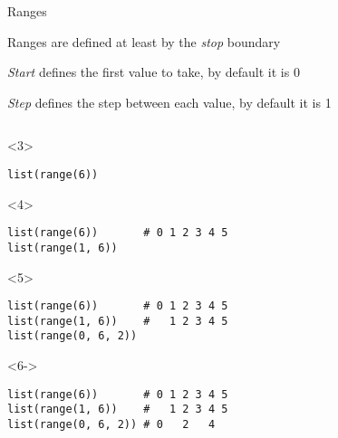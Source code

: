 \begin{frame}[fragile]{Ranges}

   Ranges are defined at least by the \textit{stop} boundary

   \textit{Start} defines the first value to take, by default it is 0

   \textit{Step} defines the step between each value, by default it is 1

  \medskip

  \begin{center}

  \begin{columns}[onlytextwidth]
    \begin{column}{\textwidth}

      \begin{onlyenv}<3>
        \begin{lstlisting}[style=python,morekeywords={for, in, range, list}]
list(range(6))

 \end{lstlisting}
      \end{onlyenv}

      \begin{onlyenv}<4>
        \begin{lstlisting}[style=python,morekeywords={for, in, range, list}]
list(range(6))       # 0 1 2 3 4 5
list(range(1, 6))
  \end{lstlisting}
      \end{onlyenv}

      \begin{onlyenv}<5>
        \begin{lstlisting}[style=python,morekeywords={for, in, range, list}]
list(range(6))       # 0 1 2 3 4 5
list(range(1, 6))    #   1 2 3 4 5
list(range(0, 6, 2)) \end{lstlisting}
      \end{onlyenv}

      \begin{onlyenv}<6->
        \begin{lstlisting}[style=python,morekeywords={for, in, range, list}]
list(range(6))       # 0 1 2 3 4 5
list(range(1, 6))    #   1 2 3 4 5
list(range(0, 6, 2)) # 0   2   4 \end{lstlisting}
      \end{onlyenv}

    \end{column}
  \end{columns}

  \end{center}

\end{frame}


